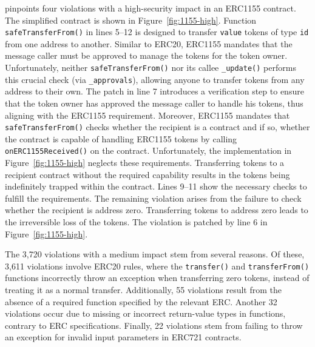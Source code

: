 \Tool{} pinpoints four violations with a high-security impact in an ERC1155 contract.
The simplified contract is shown in Figure~\ref{fig:1155-high}.
Function \texttt{safeTransferFrom()} in lines 5--12 is designed to 
transfer \texttt{value} tokens of type 
\texttt{id} from one address to another.
Similar to ERC20, ERC1155 mandates that the message caller 
must be approved to manage the tokens 
for the token owner. 
Unfortunately, neither \texttt{safeTransferFrom()} 
nor its callee \texttt{\_update()} performs this crucial 
check (via \texttt{\_approvals}), allowing anyone to transfer 
tokens from any address to their own.
The patch in line 7 introduces a verification step to ensure that 
the token owner has approved the message 
caller to handle his tokens, thus aligning with the ERC1155 requirement.
Moreover, ERC1155 mandates that \texttt{safeTransferFrom()} checks whether 
the recipient is a contract and if so, whether the contract is capable of handling
ERC1155 tokens by calling \texttt{onERC1155Received()} on the contract.
Unfortunately, the implementation in Figure~\ref{fig:1155-high} neglects these
requirements. Transferring tokens to a recipient contract without the required capability 
results in the tokens being indefinitely trapped within the contract.
Lines 9--11 show the necessary checks to fulfill the requirements.
The remaining violation arises from the failure to check 
whether the recipient is address zero. 
Transferring tokens to address zero leads to the irreversible loss of the 
tokens.
The violation is patched by line 6 in Figure~\ref{fig:1155-high}.


The 3,720 violations with a medium impact stem from several reasons. 
Of these, 3,611 violations involve ERC20 rules, 
where the \texttt{transfer()} and \texttt{transferFrom()} functions incorrectly 
throw an exception when transferring zero tokens,
instead of treating it as a normal transfer. Additionally, 55 violations result from the absence of a required function specified by the relevant ERC. 
Another 32 violations occur due to missing or incorrect return-value types in functions, contrary to ERC specifications. Finally, 22 violations stem from failing to throw an exception for invalid input parameters in ERC721 contracts.




